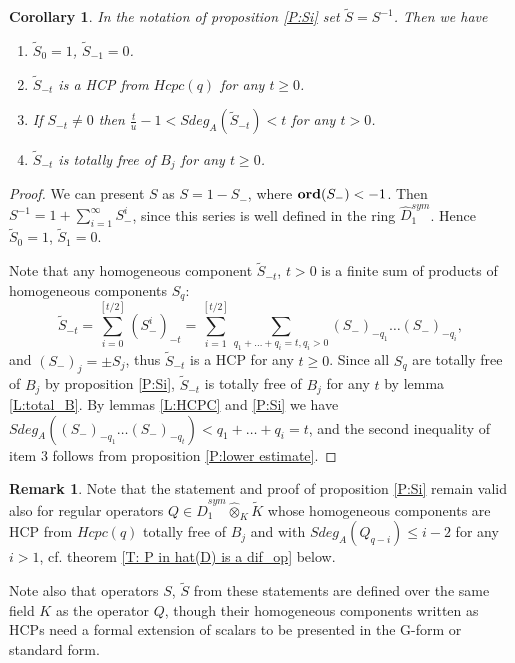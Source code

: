 \documentclass[11pt]{article}
\theoremstyle{definition}
\newcommand{\Ord}{\mathop {\rm \bf ord}}
\newtheorem{rem}{Remark}[section]
\theoremstyle{plain}
\newtheorem{cor}{Corollary}[section]
\numberwithin{equation}{section}
\begin{document}
\begin{cor}
	\label{C:Si^(-1) no B}
In the notation of proposition \ref{P:Si} set $\tilde{S}=S^{-1}$. Then we have 
	\begin{enumerate}
	\item $\tilde{S}_0=1$, $\tilde{S}_{-1}=0$.
		\item $\tilde{S}_{-t}$ is a HCP from $Hcpc(q)$ for any $t\ge 0$.
		\item If $S_{-t}\neq 0$ then $\frac{t}{u}-1< Sdeg_A(\tilde{S}_{-t})<t$ for any $t> 0$.
		\item $\tilde{S}_{-t}$ is totally free of $B_j$ for any $t\ge 0$. 
	\end{enumerate}
\end{cor}

\begin{proof}
We can present $S$ as $S=1-S_-$, where $\Ord (S_-)<-1$. Then $S^{-1}=1+\sum_{i=1}^{\infty}S_-^i$, since this series is well defined in the ring $\hat{D}_1^{sym}$. Hence $\tilde{S}_0=1$, $\tilde{S}_1=0$.

Note that any homogeneous component $\tilde{S}_{-t}$, $t>0$ is a finite sum of products of homogeneous components $S_{q}$:
$$
\tilde{S}_{-t}=\sum_{i=0}^{[t/2]}(S_-^i)_{-t}=\sum_{i=1}^{[t/2]}\sum_{q_1+\ldots + q_i=t, q_i> 0}(S_-)_{-q_1}\ldots (S_-)_{-q_i},
$$
and $(S_-)_{j}=\pm S_j$,  thus $\tilde{S}_{-t}$ is a HCP for any $t\ge 0$. Since all $S_q$ are totally free of $B_j$ by proposition \ref{P:Si}, $\tilde{S}_{-t}$ is totally free of $B_j$ for any $t$ by lemma \ref{L:total_B}. By lemmas \ref{L:HCPC} and \ref{P:Si} we have $Sdeg_A((S_-)_{-q_1}\ldots (S_-)_{-q_t})< q_1+\ldots +q_i=t$, and the second inequality of item 3 follows from proposition \ref{P:lower estimate}. 

\end{proof}

\begin{rem}
\label{R:conditon_A_for condition_A}
Note that the statement and proof of proposition \ref{P:Si} remain valid also for regular operators $Q\in \hat{D}_1^{sym}\hat{\otimes}_K\tilde{K}$ whose homogeneous components are HCP from $Hcpc(q)$ totally free of $B_j$ and with $Sdeg_A(Q_{q-i})\le i-2$ for any $i> 1$, cf. theorem \ref{T: P in hat(D) is a dif_op} below.

Note also that  operators $S$, $\tilde{S}$ from these statements are defined over the same field $K$ as the operator $Q$, though their homogeneous components written as HCPs need a formal extension of scalars to be presented in the G-form or standard form. 
\end{rem}
\end{document}
